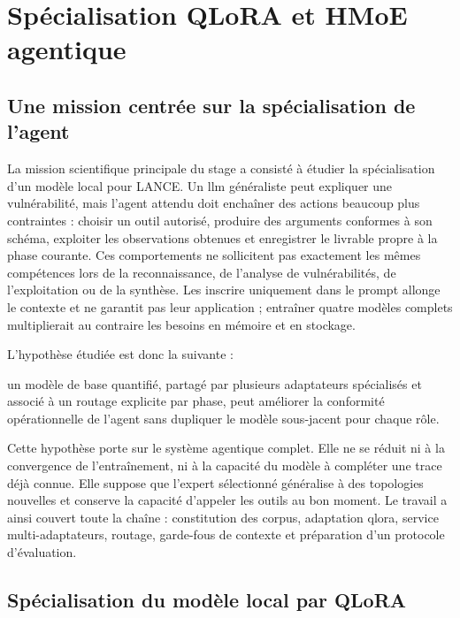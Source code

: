 \chapter{Spécialisation QLoRA et HMoE agentique}
\label{chap:science}

\section{Une mission centrée sur la spécialisation de l'agent}
\label{sec:hmoe-probleme}

La mission scientifique principale du stage a consisté à étudier la
spécialisation d'un modèle local pour LANCE. Un \gls{llm} généraliste peut expliquer une
vulnérabilité, mais l'agent attendu doit enchaîner des actions beaucoup plus
contraintes : choisir un outil autorisé, produire des arguments conformes à son
schéma, exploiter les observations obtenues et enregistrer le livrable propre à
la phase courante. Ces comportements ne sollicitent pas exactement les mêmes
compétences lors de la reconnaissance, de l'analyse de vulnérabilités, de
l'exploitation ou de la synthèse. Les inscrire uniquement dans le prompt
allonge le contexte et ne garantit pas leur application ; entraîner quatre
modèles complets multiplierait au contraire les besoins en mémoire et en
stockage.

L'hypothèse étudiée est donc la suivante : 

\begin{displayquote}
  un modèle de base quantifié, partagé par plusieurs adaptateurs spécialisés et
  associé à un routage explicite par phase, peut améliorer la conformité
  opérationnelle de l'agent sans dupliquer le modèle sous-jacent pour chaque rôle.
\end{displayquote}

Cette hypothèse porte sur le système agentique complet. Elle ne se réduit ni à
la convergence de l'entraînement, ni à la capacité du modèle à compléter une
trace déjà connue. Elle suppose que l'expert sélectionné généralise à des
topologies nouvelles et conserve la capacité d'appeler les outils au bon
moment. Le travail a ainsi couvert toute la chaîne : constitution des corpus,
adaptation \gls{qlora}, service multi-adaptateurs, routage, garde-fous de
contexte et préparation d'un protocole d'évaluation.

\section{Spécialisation du modèle local par QLoRA}
\label{sec:qlora-methode}

